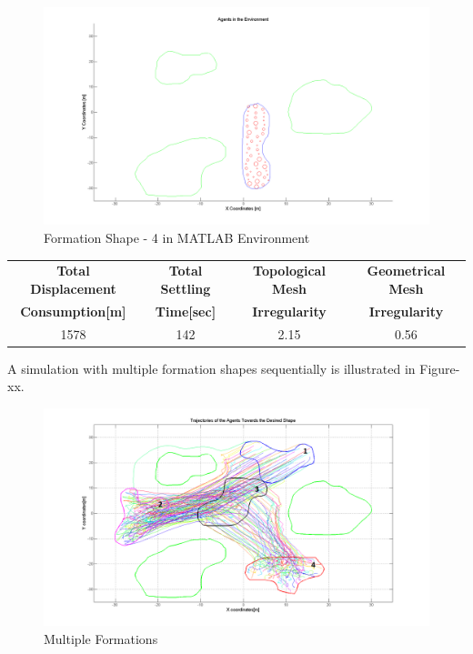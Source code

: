 \begin{figure}[H]
\caption{Formation Shape - 4 in MATLAB Environment}
\centerline{\includegraphics[scale = 0.40]{4}}
\end{figure} 
			
\begin{center}
 \label{tab:title} 
\begin{tabular}{||c| c |c |c ||}
\hline
\textbf{Total Displacement }  & \textbf{Total Settling} & \textbf{Topological Mesh} & \textbf{Geometrical Mesh} \\ \textbf{Consumption[m]} & \textbf{Time[sec]}& \textbf{Irregularity} & \textbf{Irregularity} \\
\hline
1578 & 142 &  2.15& 0.56\\
\hline
\end{tabular}
\end{center}
		
A simulation with multiple formation shapes sequentially is illustrated in Figure-xx.

\begin{figure}[H]
\caption{Multiple Formations}
\centerline{\includegraphics[scale = 0.45]{multiple_formation}}
\end{figure} 
		
